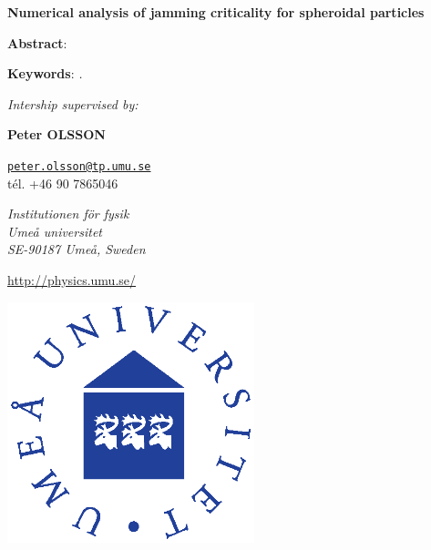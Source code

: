 \documentclass[class=report, float=false, crop=false]{standalone}
\begin{document}
\begin{center}



\vspace{1.5cm}

\textbf{\huge Numerical analysis of jamming criticality for spheroidal particles}



\vspace{0.5cm}

\parbox{15cm}{\small
\textbf{Abstract}: \it 
} %


\vspace{0.5cm}

\parbox{15cm}{
\textbf{Keywords}: \it .
} %

\vspace{0.5cm}

\parbox{15cm}{

\begin{center}

{\it \small Intership supervised by:}

\vspace{0.4cm}

\begin{minipage}{0.3\textwidth}
\centering

{\bf Peter OLSSON}

\href{mailto:peter.olsson@tp.umu.se}{\tt peter.olsson@tp.umu.se} \\ tél. +46 90 7865046


{\it Institutionen för fysik \\ Umeå universitet \\ SE-90187 Umeå, Sweden}

\url{http://physics.umu.se/}

\end{minipage}

\end{center}
} %

\vspace{0.5cm}

\includegraphics[height=7cm]{Umea_University.eps}

\end{center}

\vfill
\newpage
\end{document}
